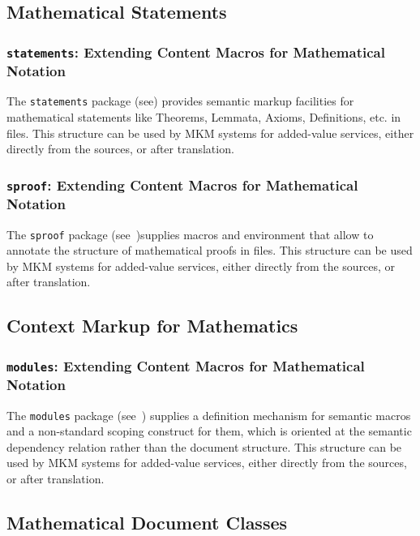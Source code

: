 \documentclass{article}
\def\ctancitesuffix{:ctan}
\def\ctancite#1{\cite{#1\ctancitesuffix}}
\begin{document}
\subsection{Mathematical Statements}

\subsubsection{{\texttt{statements}}: Extending Content Macros for Mathematical Notation}
 
The \texttt{statements} package (see\ctancite{Kohlhase:smms}) provides semantic markup
facilities for mathematical statements like Theorems, Lemmata, Axioms, Definitions,
etc. in {\stex} files. This structure can be used by MKM systems for added-value services,
either directly from the {\sTeX} sources, or after translation.

\subsubsection{{\texttt{sproof}}: Extending Content Macros for Mathematical Notation}
 
The \texttt{sproof} package (see~\ctancite{Kohlhase:smp})supplies macros and environment
that allow to annotate the structure of mathematical proofs in {\stex} files. This
structure can be used by MKM systems for added-value services, either directly from the
{\sTeX} sources, or after translation.


\subsection{Context Markup for Mathematics}

\subsubsection{{\texttt{modules}}: Extending Content Macros for Mathematical Notation}
 
The \texttt{modules} package (see~\ctancite{KohAmb:smmssl}) supplies a definition
mechanism for semantic macros and a non-standard scoping construct for them, which is
oriented at the semantic dependency relation rather than the document structure. This
structure can be used by MKM systems for added-value services, either directly from the
{\sTeX} sources, or after translation.

\subsection{Mathematical Document Classes}
\end{document}
